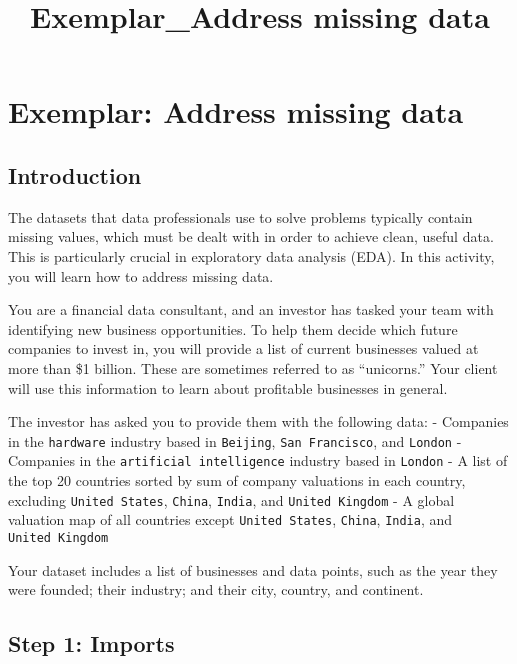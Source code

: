 \documentclass[11pt]{article}
\title{Exemplar\_Address missing data}
\begin{document}
    
    \maketitle
    
    

    
    \hypertarget{exemplar-address-missing-data}{%
\section{Exemplar: Address missing
data}\label{exemplar-address-missing-data}}

    \hypertarget{introduction}{%
\subsection{Introduction}\label{introduction}}

The datasets that data professionals use to solve problems typically
contain missing values, which must be dealt with in order to achieve
clean, useful data. This is particularly crucial in exploratory data
analysis (EDA). In this activity, you will learn how to address missing
data.

You are a financial data consultant, and an investor has tasked your
team with identifying new business opportunities. To help them decide
which future companies to invest in, you will provide a list of current
businesses valued at more than \$1 billion. These are sometimes referred
to as ``unicorns.'' Your client will use this information to learn about
profitable businesses in general.

The investor has asked you to provide them with the following data: -
Companies in the \texttt{hardware} industry based in \texttt{Beijing},
\texttt{San\ Francisco}, and \texttt{London} - Companies in the
\texttt{artificial\ intelligence} industry based in \texttt{London} - A
list of the top 20 countries sorted by sum of company valuations in each
country, excluding \texttt{United\ States}, \texttt{China},
\texttt{India}, and \texttt{United\ Kingdom} - A global valuation map of
all countries except \texttt{United\ States}, \texttt{China},
\texttt{India}, and \texttt{United\ Kingdom}

Your dataset includes a list of businesses and data points, such as the
year they were founded; their industry; and their city, country, and
continent.

    \hypertarget{step-1-imports}{%
\subsection{Step 1: Imports}\label{step-1-imports}}
\end{document}
